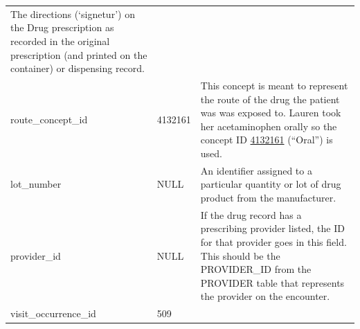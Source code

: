 \documentclass[11pt]{book}
\begin{document}
\begin{longtable}[]{@{}lll@{}}
\begin{minipage}[t]{0.48\columnwidth}
The directions (`signetur') on the Drug prescription as recorded in the
original prescription (and printed on the container) or dispensing
record.\strut
\end{minipage}\tabularnewline
\begin{minipage}[t]{0.28\columnwidth}\raggedright\strut
route\_concept\_id\strut
\end{minipage} & \begin{minipage}[t]{0.16\columnwidth}\raggedright\strut
4132161\strut
\end{minipage} & \begin{minipage}[t]{0.48\columnwidth}\raggedright\strut
This concept is meant to represent the route of the drug the patient was
was exposed to. Lauren took her acetaminophen orally so the concept ID
\href{http://athena.ohdsi.org/search-terms/terms/4132161}{4132161}
(``Oral'') is used.\strut
\end{minipage}\tabularnewline
\begin{minipage}[t]{0.28\columnwidth}\raggedright\strut
lot\_number\strut
\end{minipage} & \begin{minipage}[t]{0.16\columnwidth}\raggedright\strut
NULL\strut
\end{minipage} & \begin{minipage}[t]{0.48\columnwidth}\raggedright\strut
An identifier assigned to a particular quantity or lot of drug product
from the manufacturer.\strut
\end{minipage}\tabularnewline
\begin{minipage}[t]{0.28\columnwidth}\raggedright\strut
provider\_id\strut
\end{minipage} & \begin{minipage}[t]{0.16\columnwidth}\raggedright\strut
NULL\strut
\end{minipage} & \begin{minipage}[t]{0.48\columnwidth}\raggedright\strut
If the drug record has a prescribing provider listed, the ID for that
provider goes in this field. This should be the PROVIDER\_ID from the
PROVIDER table that represents the provider on the encounter.\strut
\end{minipage}\tabularnewline
\begin{minipage}[t]{0.28\columnwidth}\raggedright\strut
visit\_occurrence\_id\strut
\end{minipage} & \begin{minipage}[t]{0.16\columnwidth}\raggedright\strut
509\strut
\end{minipage} & \begin{minipage}[t]{0.48\columnwidth}\raggedright\strut

\end{minipage}
\end{longtable}
\end{document}
